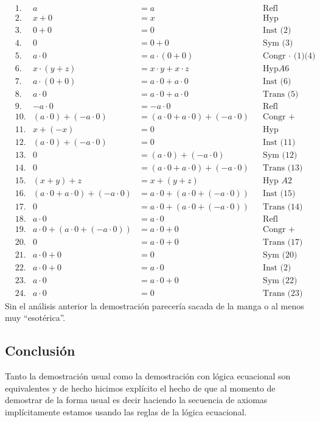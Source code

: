 \documentclass[a4paper]{article}
\begin{document}
\begin{align*}
    &\text{1.} & a &= a & &\text{Refl} \\
    &\text{2.} & x + 0 &= x & &\text{Hyp} \\
    &\text{3.} & 0 + 0 &= 0 & &\text{Inst (2)} \\
    &\text{4.} & 0 &= 0 + 0 & &\text{Sym (3)} \\
    &\text{5.} & a \cdot 0 &= a \cdot (0 + 0) & &\text{Congr \(\cdot\) (1)(4)} \\
    &\text{6.} & x \cdot (y + z) &= x \cdot y + x \cdot z & &\text{Hyp} A6 \\
    &\text{7.} & a \cdot (0 + 0) &= a \cdot 0 + a \cdot 0 & &\text{Inst (6)} \\
    &\text{8.} & a \cdot 0 &= a \cdot 0 + a \cdot 0 & &\text{Trans (5)(7)} \\
    &\text{9.} & -a \cdot 0 &= -a \cdot 0 & &\text{Refl} \\
    &\text{10.} & (a \cdot 0) + (-a \cdot 0) &= (a \cdot 0 + a \cdot 0) + (-a \cdot 0) & &\text{Congr + (8)(9)} \\
    &\text{11.} & x + (-x) &= 0 & &\text{Hyp} \\
    &\text{12.} & (a \cdot 0) + (-a \cdot 0) &= 0 & &\text{Inst (11)} \\
    &\text{13.} & 0 &= (a \cdot 0) + (-a \cdot 0) & &\text{Sym (12)} \\
    &\text{14.} & 0 &= (a \cdot 0 + a \cdot 0) + (-a \cdot 0)  & &\text{Trans (13)(10)} \\
    &\text{15.} & (x + y) + z &= x + (y + z) & &\text{Hyp } A2 \\
    &\text{16.} &  (a \cdot 0 + a \cdot 0) + (-a \cdot 0) &= a \cdot 0 + (a \cdot 0 + (-a \cdot 0))  & &\text{Inst (15)} \\
    &\text{17.} &  0 &= a \cdot 0 + (a \cdot 0 + (-a \cdot 0))  & &\text{Trans (14)(16)} \\
    &\text{18.} & a \cdot 0 &= a \cdot 0 & &\text{Refl} \\
    &\text{19.} & a \cdot 0 + (a \cdot 0 + (-a \cdot 0)) &= a \cdot 0 + 0  & &\text{Congr + (18)(12)} \\
    &\text{20.} & 0 &= a \cdot 0 + 0 & &\text{Trans (17)(19)} \\
    &\text{21.} & a \cdot 0 + 0 &= 0 & &\text{Sym (20)} \\
    &\text{22.} & a \cdot 0 + 0 &= a \cdot 0 & &\text{Inst (2)} \\
    &\text{23.} & a \cdot 0 &= a \cdot 0 + 0 & &\text{Sym (22)} \\
    &\text{24.} & a \cdot 0 &= 0 & &\text{Trans (23)(21)}
\end{align*}
Sin el análisis anterior la demostración parecería sacada de la manga o al menos 
muy ``esotérica''.
\subsection{Conclusión}
\noindent
Tanto la demostración usual como la demostración con lógica ecuacional son equivalentes y 
de hecho hicimos explícito el hecho de que al momento de demostrar de la forma usual 
es decir haciendo la secuencia de axiomas implícitamente estamos usando las reglas de la 
lógica ecuacional.
\end{document}
